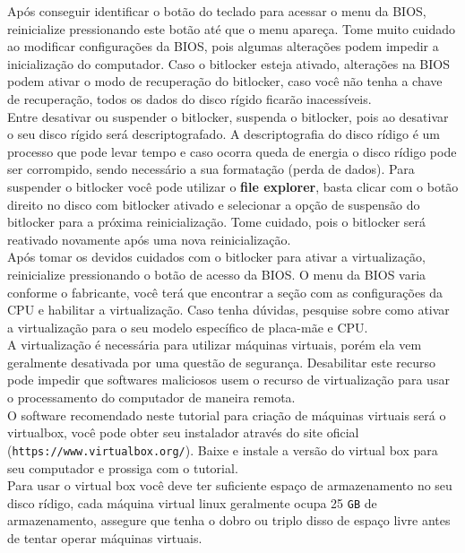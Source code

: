 \documentclass[12pt,a4paper]{article}
\begin{document}
\vspace{\baselineskip}

Após conseguir identificar o botão do teclado para acessar o menu da BIOS, reinicialize pressionando este botão até que o menu apareça. Tome muito cuidado ao modificar configurações da BIOS, pois algumas alterações podem impedir a inicialização do computador. Caso o bitlocker esteja ativado, alterações na BIOS podem ativar o modo de recuperação do bitlocker, caso você não tenha a chave de recuperação, todos os dados do disco rígido ficarão inacessíveis.\\

Entre desativar ou suspender o bitlocker, suspenda o bitlocker, pois ao desativar o seu disco rígido será descriptografado. A descriptografia do disco rídigo é um processo que pode levar tempo e caso ocorra queda de energia o disco rídigo pode ser corrompido, sendo necessário a sua formatação (perda de dados). Para suspender o bitlocker você pode utilizar o \textbf{file explorer}, basta clicar com o botão direito no disco com bitlocker ativado e selecionar a opção de suspensão do bitlocker para a próxima reinicialização. Tome cuidado, pois o bitlocker será reativado novamente após uma nova reinicialização. \\

Após tomar os devidos cuidados com o bitlocker para ativar a virtualização, reinicialize pressionando o botão de acesso da BIOS. O menu da BIOS varia conforme o fabricante, você terá que encontrar a seção com as configurações da CPU e habilitar a virtualização. Caso tenha dúvidas, pesquise sobre como ativar a virtualização para o seu modelo específico de placa-mãe e CPU. \\

A virtualização é necessária para utilizar máquinas virtuais, porém ela vem geralmente desativada por uma questão de segurança. Desabilitar este recurso pode impedir que softwares maliciosos usem o recurso de virtualização para usar o processamento do computador de maneira remota. \\

O software recomendado neste tutorial para criação de máquinas virtuais será o virtualbox, você pode obter seu instalador através do site oficial (\texttt{https://www.virtualbox.org/}). Baixe e instale a versão do virtual box para seu computador e prossiga com o tutorial. \\

Para usar o virtual box você deve ter suficiente espaço de armazenamento no seu disco rídigo, cada máquina virtual linux geralmente ocupa 25 \texttt{GB} de armazenamento, assegure que tenha o dobro ou triplo disso de espaço livre antes de tentar operar máquinas virtuais. \\
\end{document}
